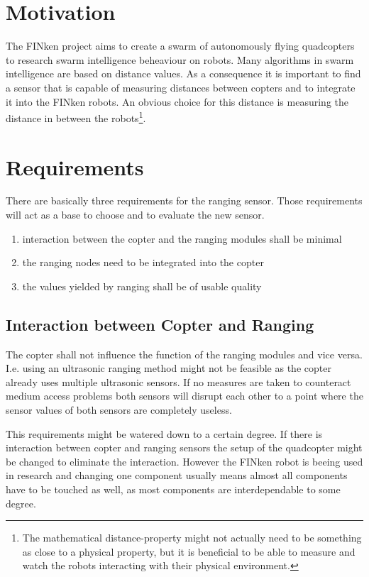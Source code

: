 \section{Motivation}

The FINken project aims to create a swarm of autonomously flying quadcopters to research swarm intelligence beheaviour on robots.
Many algorithms in swarm intelligence are based on distance values. 
As a consequence it is important to find a sensor that is capable of measuring distances between copters and to integrate it into the FINken robots.
An obvious choice for this distance is measuring the distance in between the robots\footnote{
The mathematical distance-property might not actually need to be something as close to a physical property, but it is beneficial to be able to measure and watch the robots interacting with their physical environment.}.



\section{Requirements}
\label{req}
There are basically three requirements for the ranging sensor.
Those requirements will act as a base to choose and to evaluate the new sensor.

\begin{enumerate}
	\item interaction between the copter and the ranging modules shall be minimal
	\item the ranging nodes need to be integrated into the copter
	\item the values yielded by ranging shall be of usable quality
\end{enumerate}

\subsection{Interaction between Copter and Ranging}
\label{req1}
The copter shall not influence the function of the ranging modules and vice versa.
I.e. using an ultrasonic ranging method might not be feasible as the copter already uses multiple ultrasonic sensors.
If no measures are taken to counteract medium access problems both sensors will disrupt each other to a point where the sensor values of both sensors are completely useless.

This requirements might be watered down to a certain degree.
If there is interaction between copter and ranging sensors the setup of the quadcopter might be changed to eliminate the interaction.
However the FINken robot is beeing used in research and changing one component usually means almost all components have to be touched as well, as most components are interdependable to some degree.

